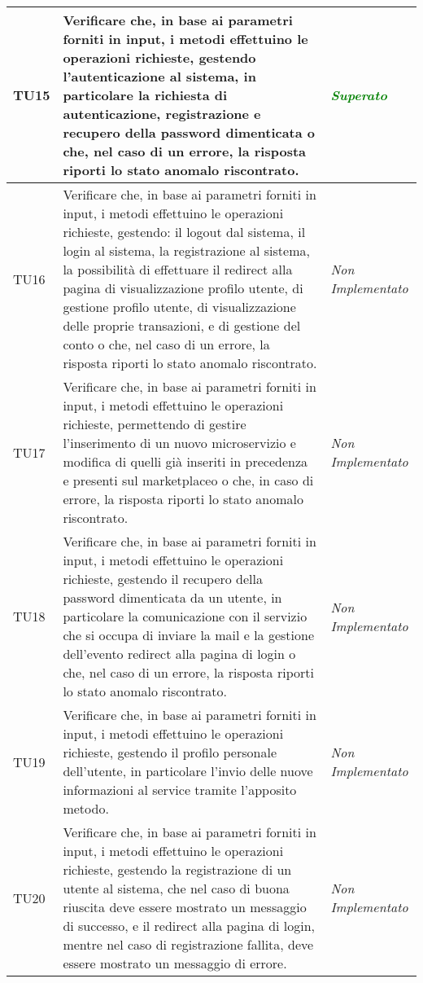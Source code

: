 \begin{longtable}{|>{\centering\arraybackslash}p{1.5cm}|>{\centering\arraybackslash}p{8cm} | >{\centering\arraybackslash}p{3.8cm}|}
		\hypertarget{TU15}{TU15} & Verificare che, in base ai parametri forniti in input, i metodi effettuino le operazioni richieste, gestendo l'autenticazione al sistema, in particolare la richiesta di autenticazione, registrazione e recupero della password dimenticata o che, nel caso di un errore, la risposta riporti lo stato anomalo riscontrato. & \textcolor{Green}{\textit{Superato}}\\ \hline
		\hypertarget{TU16}{TU16} & Verificare che, in base ai parametri forniti in input, i metodi effettuino le operazioni richieste, gestendo: il logout dal sistema, il login al sistema, la registrazione al sistema, la possibilità di effettuare il redirect alla pagina di visualizzazione profilo utente, di gestione profilo utente, di visualizzazione delle proprie transazioni, e di gestione del conto o che, nel caso di un errore, la risposta riporti lo stato anomalo riscontrato. & \textit{Non Implementato}\\ \hline
		\hypertarget{TU17}{TU17} & Verificare che, in base ai parametri forniti in input, i metodi effettuino le operazioni richieste, permettendo di gestire l'inserimento di un nuovo microservizio e modifica di quelli già inseriti in precedenza e presenti sul marketplaceo o che, in caso di errore, la risposta riporti lo stato anomalo riscontrato. & \textit{Non Implementato}\\ \hline
		\hypertarget{TU18}{TU18} & Verificare che, in base ai parametri forniti in input, i metodi effettuino le operazioni richieste, gestendo il recupero della password dimenticata da un utente, in particolare la comunicazione con il servizio che si occupa di inviare la mail e la gestione dell'evento redirect alla pagina di login o che, nel caso di un errore, la risposta riporti lo stato anomalo riscontrato. & \textit{Non Implementato}\\ \hline
		\hypertarget{TU19}{TU19} & Verificare che, in base ai parametri forniti in input, i metodi effettuino le operazioni richieste, gestendo il profilo personale dell'utente, in particolare l'invio delle nuove informazioni al service tramite l'apposito metodo. & \textit{Non Implementato}\\ \hline
		\hypertarget{TU20}{TU20} & Verificare che, in base ai parametri forniti in input, i metodi effettuino le operazioni richieste, gestendo la registrazione di un utente al sistema, che nel caso di buona riuscita deve essere mostrato un messaggio di successo, e il redirect alla pagina di login, mentre nel caso di registrazione fallita, deve essere mostrato un messaggio di errore. & \textit{Non Implementato}\\ \hline

\end{longtable}
